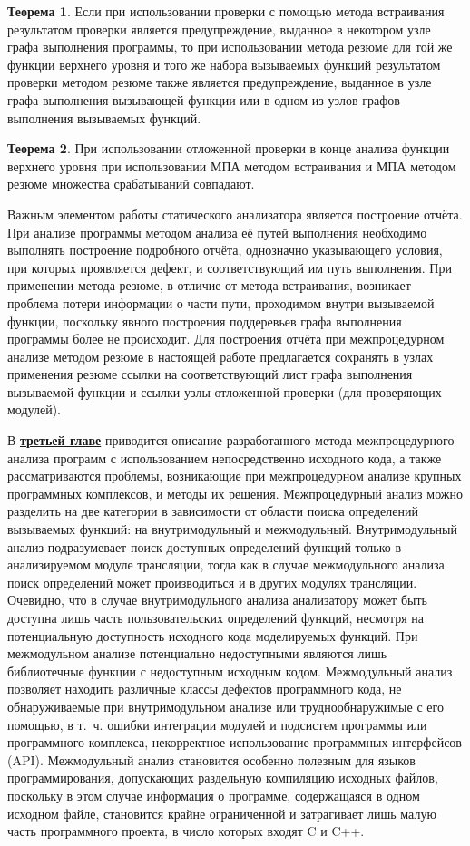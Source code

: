 \textbf{Теорема 1}. Если при использовании проверки с помощью метода встраивания результатом проверки является предупреждение, выданное в некотором узле графа выполнения программы, то при использовании метода резюме для той же функции верхнего уровня и того же набора вызываемых функций результатом проверки методом резюме также является предупреждение, выданное в узле графа выполнения вызывающей функции или в одном из узлов графов выполнения вызываемых функций.

\textbf{Теорема 2}. При использовании отложенной проверки в конце анализа функции верхнего уровня при использовании МПА методом встраивания и МПА методом резюме множества срабатываний совпадают.

Важным элементом работы статического анализатора является построение отчёта. При анализе программы методом анализа её путей выполнения необходимо выполнять построение подробного отчёта, однозначно указывающего условия, при которых проявляется дефект, и соответствующий им путь выполнения. При применении метода резюме, в отличие от метода встраивания, возникает проблема потери информации о части пути, проходимом внутри вызываемой функции, поскольку явного построения поддеревьев графа выполнения программы более не происходит. Для построения отчёта  при межпроцедурном анализе методом резюме в настоящей работе предлагается сохранять в узлах применения резюме ссылки на соответствующий лист графа выполнения вызываемой функции и ссылки узлы отложенной проверки (для проверяющих модулей).

В \underline{\textbf{третьей главе}} приводится описание разработанного метода межпроцедурного анализа программ с использованием непосредственно исходного кода, а также рассматриваются проблемы, возникающие при межпроцедурном анализе крупных программных комплексов, и методы их решения. Межпроцедурный анализ можно разделить на две категории в зависимости от области поиска определений вызываемых функций: на внутримодульный и межмодульный. Внутримодульный анализ подразумевает поиск доступных определений функций только в анализируемом модуле трансляции, тогда как в случае межмодульного анализа поиск определений может производиться и в других модулях трансляции. Очевидно, что в случае внутримодульного анализа анализатору может быть доступна лишь часть пользовательских определений функций, несмотря на потенциальную доступность исходного  кода моделируемых функций. При межмодульном анализе потенциально недоступными являются лишь библиотечные функции с недоступным исходным кодом. Межмодульный анализ позволяет находить различные классы дефектов программного кода, не обнаруживаемые при внутримодульном анализе или труднообнаружимые с его помощью, в т.~ч. ошибки интеграции модулей и подсистем программы или программного комплекса, некорректное использование программных интерфейсов (API). Межмодульный анализ становится особенно полезным для языков программирования, допускающих раздельную компиляцию исходных файлов, поскольку в этом случае информация о программе, содержащаяся в одном исходном файле, становится крайне ограниченной и затрагивает лишь малую часть программного проекта, в число которых входят C и C++.

